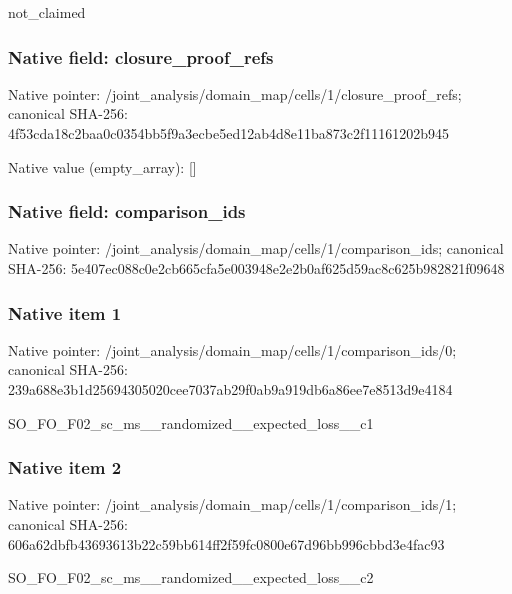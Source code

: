 \documentclass[10pt,a4paper]{article}
\begin{document}
\begingroup\raggedright\sloppy not\_\allowbreak{}claimed\par\endgroup

\subsubsection{Native field: closure\_\allowbreak{}proof\_\allowbreak{}refs}
Native pointer: /joint\_\allowbreak{}analysis/domain\_\allowbreak{}map/cells/1/closure\_\allowbreak{}proof\_\allowbreak{}refs; canonical SHA-256: 4f53cda18c2baa0c0354bb5f9a3ecbe5ed12ab4d8e11ba873c2f11161202b945

Native value (empty\_\allowbreak{}array): []

\subsubsection{Native field: comparison\_\allowbreak{}ids}
Native pointer: /joint\_\allowbreak{}analysis/domain\_\allowbreak{}map/cells/1/comparison\_\allowbreak{}ids; canonical SHA-256: 5e407ec088c0e2cb665cfa5e003948e2e2b0af625d59ac8c625b982821f09648

\subsubsection{Native item 1}
Native pointer: /joint\_\allowbreak{}analysis/domain\_\allowbreak{}map/cells/1/comparison\_\allowbreak{}ids/0; canonical SHA-256: 239a688e3b1d25694305020cee7037ab29f0ab9a919db6a86ee7e8513d9e4184

\begingroup\raggedright\sloppy SO\_\allowbreak{}FO\_\allowbreak{}F02\_\allowbreak{}sc\_\allowbreak{}ms\_\allowbreak{}\_\allowbreak{}randomized\_\allowbreak{}\_\allowbreak{}expected\_\allowbreak{}loss\_\allowbreak{}\_\allowbreak{}c1\par\endgroup

\subsubsection{Native item 2}
Native pointer: /joint\_\allowbreak{}analysis/domain\_\allowbreak{}map/cells/1/comparison\_\allowbreak{}ids/1; canonical SHA-256: 606a62dbfb43693613b22c59bb614ff2f59fc0800e67d96bb996cbbd3e4fac93

\begingroup\raggedright\sloppy SO\_\allowbreak{}FO\_\allowbreak{}F02\_\allowbreak{}sc\_\allowbreak{}ms\_\allowbreak{}\_\allowbreak{}randomized\_\allowbreak{}\_\allowbreak{}expected\_\allowbreak{}loss\_\allowbreak{}\_\allowbreak{}c2\par\endgroup
\end{document}
